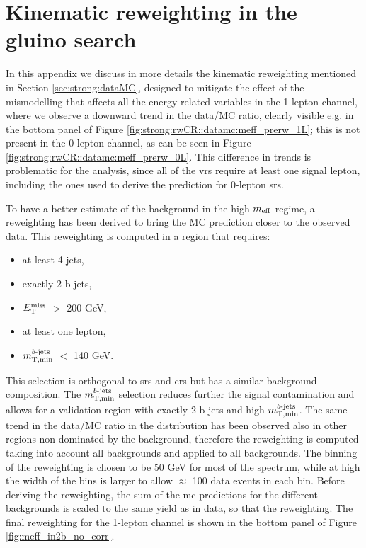 \chapter{Kinematic reweighting in the gluino search}
\label{app:meffrw}

In this appendix we discuss in more details the kinematic reweighting mentioned in Section \ref{sec:strong:dataMC},
designed to mitigate the effect of the mismodelling that affects all the energy-related variables in the 1-lepton channel,
where we observe a downward trend in the data/MC ratio, clearly visible e.g. in the bottom panel of 
Figure \ref{fig:strong:rwCR::datamc:meff_prerw_1L}; this is not present in the 0-lepton channel, as can be seen in 
Figure \ref{fig:strong:rwCR::datamc:meff_prerw_0L}.
This difference in trends is problematic for the analysis, since all of the \glspl{vr} require at least one signal lepton, 
including the ones used to derive the prediction for 0-lepton \glspl{sr}.

To have a better estimate of the background in the high-$m_{\mathrm{eff}}$ regime, a reweighting has been derived to bring the MC prediction closer to the observed data. This reweighting is computed in a region that requires:
\begin{itemize}
\item at least 4 jets,
\item exactly 2 b-jets,
\item $E_{\rm T}^{\mathrm{miss}}$ $>$ 200 GeV,
\item at least one lepton,
\item $m_{\mathrm{T, min}}^{b\textrm{-jets}}$ $<$ 140 GeV.
\end{itemize}

This selection is orthogonal to \glspl{sr} and \glspl{cr} but has a similar background composition. 
The $m_{\mathrm{T, min}}^{b\textrm{-jets}}$ selection reduces further the signal contamination and allows for a validation region with exactly 2 b-jets and high $m_{\mathrm{T, min}}^{b\textrm{-jets}}$. 
The same trend in the data/MC ratio in the \meff distribution has been observed also in other regions non dominated by the 
\ttbar background,
therefore the reweighting is computed taking into account all backgrounds and applied to all backgrounds. 
The binning of the reweighting is chosen to be 50 GeV for most of the \meff spectrum, 
while at high \meff the width of the bins is larger to allow $\approx$ 100 data events in each bin. 
Before deriving the reweighting, the sum of the \gls{mc} predictions for the different backgrounds is scaled to the same yield as in data,
so that the reweighting.
The final reweighting for the 1-lepton channel is shown in the bottom panel of Figure \ref{fig:meff_in2b_no_corr}.

